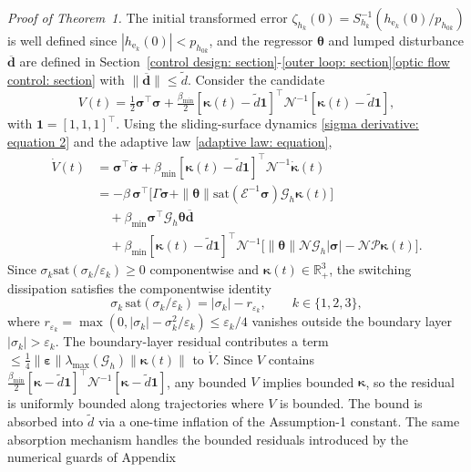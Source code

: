 \documentclass{IEEEtaes}
\begin{document}
\textit{Proof of Theorem~1.} The initial transformed error $\zeta_{h_k}(0) = S_{h_k}^{-1}(h_{\text{e}_k}(0)/p_{h_{0k}})$ is well defined since $|h_{\text{e}_k}(0)|<p_{h_{0k}}$, and the regressor $\boldsymbol{\theta}$ and lumped disturbance $\boldsymbol{\overline{d}}$ are defined in Section~\ref{control design: section}-\ref{outer loop: section}\ref{optic flow control: section} with $\|\boldsymbol{\overline{d}}\|\le\tilde{d}$. Consider the candidate
\begin{equation} \label{V candidate: equation}
    V(t) = \tfrac12\boldsymbol{\sigma}^\top\boldsymbol{\sigma} + \tfrac{\beta_{\min}}{2}[\boldsymbol{\kappa}(t)-\tilde{d}\boldsymbol{1}]^\top\mathcal{N}^{-1}[\boldsymbol{\kappa}(t)-\tilde{d}\boldsymbol{1}],
\end{equation}
with $\boldsymbol{1}=[1,1,1]^\top$. Using the sliding-surface dynamics \eqref{sigma derivative: equation 2} and the adaptive law \eqref{adaptive law: equation},
\begin{align*}
\dot{V}(t) &= \boldsymbol{\sigma}^\top\dot{\boldsymbol{\sigma}} + \beta_{\min}[\boldsymbol{\kappa}(t)-\tilde{d}\boldsymbol{1}]^\top\mathcal{N}^{-1}\dot{\boldsymbol{\kappa}}(t)\\
&= -\beta\,\boldsymbol{\sigma}^\top\!\big[\Gamma\boldsymbol{\sigma}+\|\boldsymbol{\theta}\|\text{sat}(\mathcal{E}^{-1}\boldsymbol{\sigma})\mathcal{G}_h\boldsymbol{\kappa}(t)\big]\\
&\quad + \beta_{\min}\boldsymbol{\sigma}^\top\mathcal{G}_h\boldsymbol{\theta}\boldsymbol{\overline{d}}\\
&\quad + \beta_{\min}[\boldsymbol{\kappa}(t)-\tilde{d}\boldsymbol{1}]^\top\mathcal{N}^{-1}\!\big[\|\boldsymbol{\theta}\|\mathcal{N}\mathcal{G}_h|\boldsymbol{\sigma}| - \mathcal{N}\mathcal{P}\boldsymbol{\kappa}(t)\big].
\end{align*}
Since $\sigma_k\text{sat}(\sigma_k/\varepsilon_k)\ge 0$ componentwise and $\boldsymbol{\kappa}(t)\in\mathbb{R}_+^3$, the switching dissipation satisfies the componentwise identity
\begin{equation*}
\sigma_k\,\text{sat}(\sigma_k/\varepsilon_k) = |\sigma_k| - r_{\varepsilon_k},\qquad k\in\{1,2,3\},
\end{equation*}
where $r_{\varepsilon_k} = \max(0,|\sigma_k|-\sigma_k^2/\varepsilon_k)\le\varepsilon_k/4$ vanishes outside the boundary layer $|\sigma_k|>\varepsilon_k$. The boundary-layer residual contributes a term $\le\tfrac14\|\boldsymbol{\varepsilon}\|\lambda_{\max}(\mathcal{G}_h)\|\boldsymbol{\kappa}(t)\|$ to $\dot V$. Since $V$ contains $\tfrac{\beta_{\min}}{2}[\boldsymbol{\kappa}-\tilde d\boldsymbol{1}]^\top\mathcal{N}^{-1}[\boldsymbol{\kappa}-\tilde d\boldsymbol{1}]$, any bounded $V$ implies bounded $\boldsymbol{\kappa}$, so the residual is uniformly bounded along trajectories where $V$ is bounded. The bound is absorbed into $\tilde{d}$ via a one-time inflation of the Assumption-1 constant. The same absorption mechanism handles the bounded residuals introduced by the numerical guards of Appendix~
\end{document}
